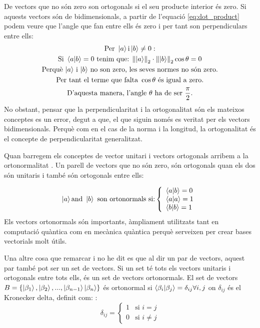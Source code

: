 De vectors que no són zero son ortogonals si el seu producte interior és zero. Si aquests vectors són de bidimensionals, a partir de l'equació \eqref{eq:dot_product} podem veure que l'angle que fan entre ells és zero i per tant son perpendiculars entre ells: 
\begin{multline*}
	 \text{Per }\ket{a} \text{i} \ket{b}\neq 0 : \\
	\text{Si }\bra{a}\ket{b} = 0 \text{ tenim que: } \norm{\ket{a}}_2 \cdot \norm{\ket{b}}_2 \cos \theta = 0 \\
	 \text{Perquè $\ket{a}$ i $\ket{b}$ no son zero, les seves normes no són zero.} \\
	 \text{Per tant el terme que falta } \cos\theta \text{ és igual a zero.} \\
	 \text{D'aquesta manera, l'angle $\theta$ ha de ser } \frac{\pi}{2}. \\
\end{multline*}
No obstant, pensar que la perpendicularitat i la ortogonalitat són els mateixos conceptes es un error, degut a que, el que siguin només es veritat per els vectors bidimensionals. Perquè com en el cas de la norma i la longitud, la ortogonalitat és el concepte de perpendicularitat generalitzat. 

Quan barregem els conceptes de vector unitari i vectors ortogonals arribem a la ortonormalitat \cite{QCandQI:GramSchmidt}. Un parell de vectors que no són zero, són ortogonals quan els dos són unitaris i també són ortogonals entre ells:

$$
\ket{a} \text{and } \ket{b} \text{ son ortonormals si:} \left\{
	\begin{array}{ll}
		\bra{a}\ket{b} = 0 \\
		\bra{a}\ket{a} = 1 \\
		\bra{b}\ket{b} = 1 \\
	\end{array}
\right.
$$
Els vectors ortonormals són importants, àmpliament utilitzats tant en computació quàntica com en mecànica quàntica perquè serveixen per crear bases vectorials molt útils. 

Una altre cosa que remarcar i no he dit es que al dir un par de vectors, aquest par també pot ser un set de vectors. Si un set té tots els vectors unitaris i ortogonals entre tots ells, és un set de vectors ortonormals. 
El set de vectors $ B = \{\ket{\beta_1}, \ket{\beta_2}, ..., \ket{\beta_{n-1}} \ket{\beta_n}\} $ és ortonormal si $\bra{\beta_i}\ket{\beta_j} = \delta_{ij}  \forall i, j$ \cite{QCandQI:GramSchmidt} on $\delta_{ij}$ és el Kronecker delta, definit com:
: 
$$
\delta_{ij} =
\begin{cases}
	1 &\text{si } i=j\\
	0 &\text{si } i\neq j
\end{cases}
$$

